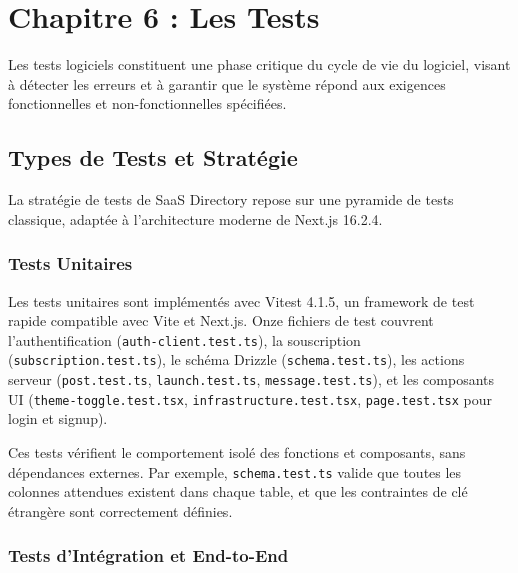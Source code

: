 
\section{Chapitre 6 : Les Tests}



Les tests logiciels constituent une phase critique du cycle de vie du logiciel, visant à détecter les erreurs et à garantir que le système répond aux exigences fonctionnelles et non-fonctionnelles spécifiées.



\subsection{Types de Tests et Stratégie}



La stratégie de tests de SaaS Directory repose sur une pyramide de tests classique, adaptée à l'architecture moderne de Next.js 16.2.4.



\subsubsection{Tests Unitaires}



Les tests unitaires sont implémentés avec Vitest 4.1.5, un framework de test rapide compatible avec Vite et Next.js. Onze fichiers de test couvrent l'authentification (\texttt{auth-client.test.ts}), la souscription (\texttt{subscription.test.ts}), le schéma Drizzle (\texttt{schema.test.ts}), les actions serveur (\texttt{post.test.ts}, \texttt{launch.test.ts}, \texttt{message.test.ts}), et les composants UI (\texttt{theme-toggle.test.tsx}, \texttt{infrastructure.test.tsx}, \texttt{page.test.tsx} pour login et signup).



Ces tests vérifient le comportement isolé des fonctions et composants, sans dépendances externes. Par exemple, \texttt{schema.test.ts} valide que toutes les colonnes attendues existent dans chaque table, et que les contraintes de clé étrangère sont correctement définies.



\subsubsection{Tests d'Intégration et End-to-End}



